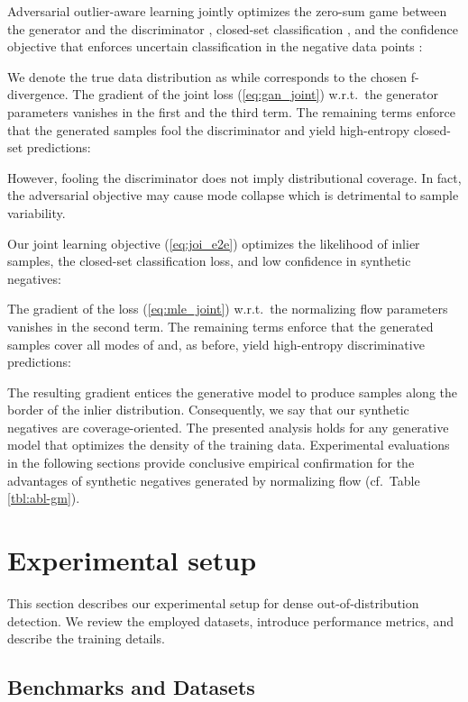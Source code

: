 \documentclass[lettersize,journal,hidelinks]{IEEEtran}
\begin{document}
Adversarial outlier-aware learning \cite{lee18iclr} jointly optimizes 
the zero-sum game between the generator  
and the discriminator , closed-set classification , and the confidence objective that enforces uncertain classification 
in the negative data points \cite{lee18iclr}:

We denote the true data distribution as  while
 corresponds to the chosen f-divergence.
The gradient of the joint loss (\ref{eq:gan_joint}) w.r.t.\ the generator parameters  vanishes in the first and the third term.
The remaining terms enforce that the generated samples fool the discriminator and yield high-entropy closed-set predictions:

However, fooling the discriminator does not imply distributional coverage.
In fact, the adversarial objective may cause mode collapse \cite{metz17iclr} which is detrimental to sample  variability.

Our joint learning objective (\ref{eq:joi_e2e}) optimizes the likelihood of inlier samples, the closed-set classification loss, and low confidence in synthetic negatives:

The gradient of the loss (\ref{eq:mle_joint}) w.r.t.\ the normalizing flow parameters  vanishes in the second term.
The remaining terms enforce that the generated samples cover all modes of  and, as before, yield high-entropy discriminative predictions:

The resulting gradient entices the generative model to produce samples along the border of the inlier distribution.
Consequently, we say that our synthetic negatives are coverage-oriented.
The presented analysis holds for any generative model that optimizes
the density of the training data.
Experimental evaluations in the following sections provide conclusive empirical confirmation 
for the advantages of synthetic negatives generated by normalizing flow (cf.\ Table \ref{tbl:abl-gm}).


\section{Experimental setup}

This section describes our experimental setup for dense out-of-distribution detection.
We review the employed datasets, introduce performance metrics, and
describe the training details.

\subsection{Benchmarks and Datasets}
\end{document}
